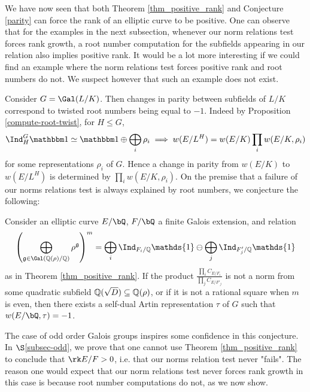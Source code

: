 We have now seen that both Theorem \ref{thm_positive_rank} and Conjecture \ref{parity} can force the rank of an elliptic curve to be positive. One can observe that for the examples in the next subsection, whenever our norm relations test forces rank growth, a root number computation for the subfields appearing in our relation also implies positive rank. 
It would be a lot more interesting if we could find an example where the norm relations test forces positive rank and root numbers do not. 
We suspect however that such an example does not exist. 

Consider $G = \Gal(L / K)$. Then changes in parity between subfields of $L / K$ correspond to twisted root numbers being equal to $-1$. Indeed by Proposition \ref{compute-root-twist}, for $H \leq G$, 
\[ \Ind_{H}^G \trivial \simeq \trivial\oplus \bigoplus_i \rho_i  \implies w(E / L^H) = w(E / K)\prod_i w(E / K, \rho_i) \] for some representations $\rho_i $ of $G $. Hence a change in parity from $w(E / K)$ to $w(E / L^H)$ is determined by $\prod_i w(E / K, \rho_i)$. On the premise that a failure of our norms relations test is always explained by root numbers, we conjecture the following:

\begin{conj}
Consider an elliptic curve $E / \bQ$, $F / \bQ$ a finite Galois extension, and relation 
$$\left(\bigoplus_{\mathfrak{g}\in\Gal(\QQ(\rho)/\QQ)}\rho^{\mathfrak{g}}\right)^m=\bigoplus_i\Ind_{F_i/\QQ}\mathds{1}\ominus\bigoplus_j\Ind_{F'_j/\QQ}\mathds{1}$$
as in Theorem \ref{thm_positive_rank}. If the product $\frac{\prod_i C_{E/F_i}}{\prod_j C_{E/F'_j}}$ is not a norm from some quadratic subfield $\mathbb{Q}(\sqrt{D})\subseteq\mathbb{Q}(\rho)$, or if it is not a rational square when $m$ is even, then there exists a self-dual Artin representation $\tau$ of $G$ such that $w(E / \bQ, \tau) = -1 $. 
\end{conj}

The case of odd order Galois groups inspires some confidence in this conjecture. In $\S$\ref{subsec-odd}, we prove that one cannot use Theorem \ref{thm_positive_rank} to conclude that $\rk E / F > 0$, i.e. that our norms relation test never "fails".
The reason one would expect that our norm relations test never forces rank growth in this case is because root number computations do not, as we now show.


